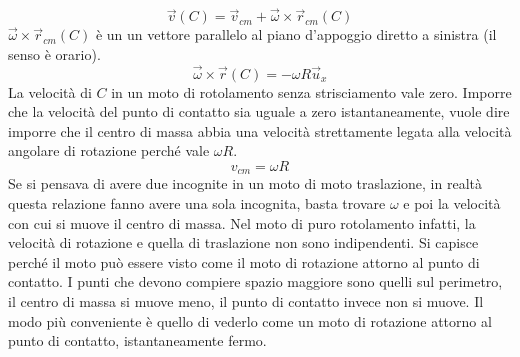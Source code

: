 \documentclass[10pt,a4paper]{book}
\begin{document}
\[
	\vec{v} (C) = \vec{v}_{cm} + \vec{\omega}\times \vec{r}_{cm}(C)
\]
$\vec{\omega}\times \vec{r}_{cm}(C)$ è un un vettore parallelo al piano d'appoggio diretto a sinistra (il senso è orario).
\[
	\vec{\omega} \times \vec{r}(C) = -\omega R \vec{u}_x
\]
La velocità di $C$ in un moto di rotolamento senza strisciamento vale zero. Imporre che la velocità del punto di contatto sia uguale a zero istantaneamente, vuole dire imporre che il centro di massa abbia una velocità strettamente legata alla velocità angolare di rotazione perché vale $\omega R$.
\[
	\boxed{v_{cm} = \omega R}
\]
Se si pensava di avere due incognite in un moto di moto traslazione, in realtà questa relazione fanno avere una sola incognita,  basta trovare $\omega$ e poi la velocità con cui si muove il centro di massa. Nel moto di puro rotolamento infatti, la velocità di rotazione e quella di traslazione non sono indipendenti.
Si capisce perché il moto può essere visto come il moto di rotazione attorno al punto di contatto. I punti che devono compiere spazio maggiore sono quelli sul perimetro, il centro di massa si muove meno, il punto di contatto invece non si muove. Il modo più conveniente è quello di vederlo come un moto di rotazione attorno al punto di contatto, istantaneamente fermo.
\end{document}

